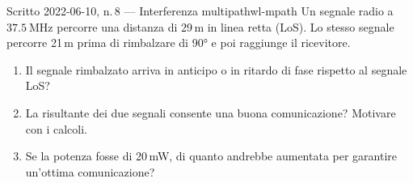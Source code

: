 \documentclass{report}
\begin{document}
\begin{Exercise}{Scritto 2022-06-10, n.\,8 --- Interferenza multipath}{wl-mpath}
Un segnale radio a $37.5\ \text{MHz}$ percorre una distanza di 29\,m in linea
retta (LoS). Lo stesso segnale percorre 21\,m prima di rimbalzare di 90° e poi
raggiunge il ricevitore.
\begin{enumerate}
  \item Il segnale rimbalzato arriva in anticipo o in ritardo di fase rispetto al
        segnale LoS?
  \item La risultante dei due segnali consente una buona comunicazione?
        Motivare con i calcoli.
  \item Se la potenza fosse di 20\,mW, di quanto andrebbe aumentata per garantire
        un'ottima comunicazione?
\end{enumerate}
\end{Exercise}
\end{document}
